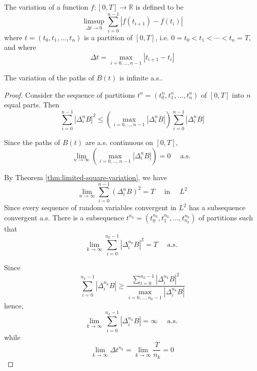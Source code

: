 \begin{definition}[Variation]
	The variation of a function $f:[0,T]\rightarrow\mathbb{R}$ is defined to be
	\begin{equation}
		\limsup_{\Delta t\rightarrow 0}\sum_{i=0}^{n-1}\left|f\left(t_{i+1}\right)-f\left(t_{i}\right)\right|
	\end{equation}
	where $t=\left(t_{0},t_{1},\ldots,t_{n}\right)$ is a partition of $[0,T]$, i.e. $0=t_{0}<t_{1}<\cdots<t_{n}=T$, and where
	\begin{equation}
		\Delta t=\max_{i=0,\ldots,n-1}\left|t_{i+1}-t_{i}\right|
	\end{equation}
\end{definition}

\begin{theorem}
	The variation of the paths of $B(t)$ is infinite a.s..
\end{theorem}

\begin{proof}
	Consider the sequence of partitions $t^{n}=\left(t_{0}^{n},t_{1}^{n},\ldots,t_{n}^{n}\right)$ of $[0,T]$ into $n$ equal parts. Then
	\begin{equation*}
		\sum_{i=0}^{n-1}\left|\Delta_{i}^{n}B\right|^{2}\leq\left(\max_{i=0,\ldots,n-1}\left|\Delta_{i}^{n}B\right|\right)\sum_{i=0}^{n-1}\left|\Delta_{i}^{n}B\right|
	\end{equation*}

	Since the paths of $B(t)$ are a.s. continuous on $[0,T]$,
	\begin{equation*}
		\lim_{n\rightarrow\infty}\left(\max_{i=0,\ldots,n-1}\left|\Delta_{i}^{n}B\right|\right)=0\quad\text{ a.s. }
	\end{equation*}

	By Theorem \ref{thm:limited-square-variation}, we have
	\begin{equation*}
		\lim_{n\rightarrow\infty}\sum_{i=0}^{n-1}\left(\Delta_{i}^{n}B\right)^{2}=T\quad\text { in }\quad L^{2}
	\end{equation*}
	Since every sequence of random variables convergent in $L^{2}$ has a subsequence convergent a.s. There is a subsequence $t^{n_{k}}=\left(t_{0}^{n_{k}},t_{1}^{n_{k}},\ldots,t_{n_{k}}^{n_{k}}\right)$ of partitions such that
	\begin{equation*}
		\lim_{k\rightarrow\infty}\sum_{i=0}^{n_{k}-1}\left|\Delta_{i}^{n_{k}}B\right|^{2}=T\quad\text{ a.s. }
	\end{equation*}

	Since
	\begin{equation*}
		\sum_{i=0}^{n_{k}-1}\left|\Delta_{i}^{n_{k}}B\right|\geq\frac{\sum_{i=0}^{n_{k}-1}\left|\Delta_{i}^{n_{k}}B\right|^{2}}{\max_{i=0,\ldots,n_{k}-1}\left|\Delta_{i}^{n_{k}}B\right|}
	\end{equation*}
	hence,
	\begin{equation*}
		\lim_{k\rightarrow\infty}\sum_{i=0}^{n_{k}-1}\left|\Delta_{i}^{n_{k}}B\right|=\infty\quad\text{ a.s. }
	\end{equation*}
	while
	\begin{equation*}
		\lim_{k\rightarrow\infty}\Delta t^{n_{k}}=\lim_{k\rightarrow\infty}\frac{T}{n_{k}}=0
	\end{equation*}
\end{proof}


